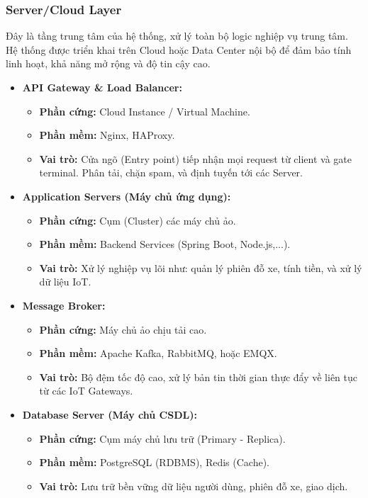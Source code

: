 \subsubsection{Server/Cloud Layer}
Đây là tầng trung tâm của hệ thống, xử lý toàn bộ logic nghiệp vụ trung tâm. Hệ thống được triển khai trên Cloud hoặc Data Center nội bộ để đảm bảo tính linh hoạt, khả năng mở rộng và độ tin cậy cao. 
\begin{itemize}
    \item \textbf{API Gateway \& Load Balancer:}
    \begin{itemize}
        \item \textbf{Phần cứng:} Cloud Instance / Virtual Machine.
        \item \textbf{Phần mềm:} Nginx, HAProxy.
        \item \textbf{Vai trò:} Cửa ngõ (Entry point) tiếp nhận mọi request từ client và gate terminal. Phân tải, chặn spam, và định tuyến tới các Server.
    \end{itemize}
    \item \textbf{Application Servers (Máy chủ ứng dụng):}
    \begin{itemize}
        \item \textbf{Phần cứng:} Cụm (Cluster) các máy chủ ảo.
        \item \textbf{Phần mềm:} Backend Services (Spring Boot, Node.js,...).
        \item \textbf{Vai trò:} Xử lý nghiệp vụ lõi như: quản lý phiên đỗ xe, tính tiền, và xử lý dữ liệu IoT.
    \end{itemize}
    \item \textbf{Message Broker:}
    \begin{itemize}
        \item \textbf{Phần cứng:} Máy chủ ảo chịu tải cao.
        \item \textbf{Phần mềm:} Apache Kafka, RabbitMQ, hoặc EMQX.
        \item \textbf{Vai trò:} Bộ đệm tốc độ cao, xử lý bản tin thời gian thực đẩy về liên tục từ các IoT Gateways.
    \end{itemize}
    \item \textbf{Database Server (Máy chủ CSDL):}
    \begin{itemize}
        \item \textbf{Phần cứng:} Cụm máy chủ lưu trữ (Primary - Replica).
        \item \textbf{Phần mềm:} PostgreSQL (RDBMS), Redis (Cache).
        \item \textbf{Vai trò:} Lưu trữ bền vững dữ liệu người dùng, phiên đỗ xe, giao dịch.
    \end{itemize}
\end{itemize}

